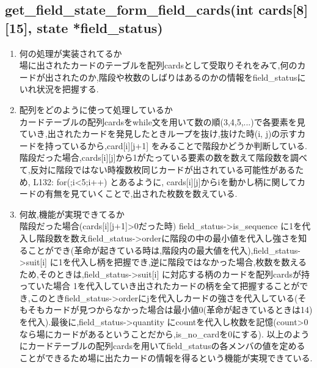 \documentclass{jsarticle}
\begin{document}
\subsection{get\_field\_state\_form\_field\_cards(int cards[8][15], state *field\_status)}
\begin{enumerate}
  \item  何の処理が実装されてるか\\
  場に出されたカードのテーブルを配列cardsとして受取りそれをみて,何のカードが出されたのか,階段や枚数のしばりはあるのかの情報をfield\_statusにいれ状況を把握する.
  \item  配列をどのように使って処理しているか\\
  カードテーブルの配列cardsをwhile文を用いて数の順(3,4,5,...)で各要素を見ていき,出されたカードを発見したときループを抜け,抜けた時(i, j)の示すカードを持っているから,card[i][j+1] をみることで階段かどうか判断している.階段だった場合,cards[i][j]から1がたっている要素の数を数えて階段数を調べて,反対に階段ではない時複数枚同じカードが出されている可能性があるため, L132: for(;i\textless 5;i++) とあるように, cards[i][j]からiを動かし柄に関してカードの有無を見ていくことで,出された枚数を数えている.

  \item  何故,機能が実現できてるか\\
  階段だった場合(cards[i][j+1]\textgreater 0だった時) field\_status-\textgreater is\_sequence に1を代入し階段数を数えfield\_status-\textgreater orderに階段の中の最小値を代入し強さを知ることができ(革命が起きている時は,階段内の最大値を代入),field\_status-\textgreater suit[i] に1を代入し柄を把握でき,逆に階段ではなかった場合,枚数を数えるため,そのときは,field\_status-\textgreater suit[i] に対応する柄のカードを配列cardsが持っていた場合 1を代入していき出されたカードの柄を全て把握することができ,このときfield\_status-\textgreater orderにjを代入しカードの強さを代入している(そもそもカードが見つからなかった場合は最小値0(革命が起きているときは14)を代入).最後に,field\_status-\textgreater quantity にcountを代入し枚数を記憶(count\textgreater 0なら場にカードがあるということだから,is\_no\_cardを0にする).
  以上のようにカードテーブルの配列cardsを用いてfield\_statusの各メンバの値を定めることができるため場に出たカードの情報を得るという機能が実現できている.

\end{enumerate}
\end{document}
